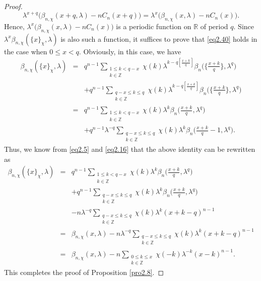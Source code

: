 \documentclass[reqno]{amsart}
\numberwithin{equation}{section}
\begin{document}
\begin{proof}
\begin{equation*}
\lambda^{x+q}\bigl(\beta_{n,\chi}(x+q,\lambda)-nC_{n}(x+q)\bigl)=\lambda^{x}\bigl(\beta_{n,\chi}(x,\lambda)-nC_{n}(x)\bigl).
\end{equation*}
Hence, $\lambda^{x}\bigl(\beta_{n,\chi}(x,\lambda)-nC_{n}(x)\bigl)$ is a periodic function on $\mathbb{R}$ of period $q$.
Since $\lambda^{x}\beta_{n,\chi}(\{x\}_{\chi},\lambda)$ is also such a function, it suffices to prove that \eqref{eq2.40} holds in the case when $0\leqslant x<q$. Obviously, in this case, we have
\begin{eqnarray*}
\beta_{n,\chi}(\{x\}_{\chi},\lambda)&=&q^{n-1}\underset{\substack{1\leqslant k< q-x\\ k\in\mathbb{Z}}}{\sum}\chi(k)\lambda^{k-q[\frac{x+k}{q}]}\beta_{n}\biggl(\biggl\{\frac{x+k}{q}\biggl\},\lambda^{q}\biggl)\nonumber\\
&&+q^{n-1}\underset{\substack{q-x\leqslant k\leqslant q\\ k\in\mathbb{Z}}}{\sum}\chi(k)\lambda^{k-q[\frac{x+k}{q}]}\beta_{n}\biggl(\biggl\{\frac{x+k}{q}\biggl\},\lambda^{q}\biggl)\nonumber\\
&=&q^{n-1}\underset{\substack{1\leqslant k< q-x\\ k\in\mathbb{Z}}}{\sum}\chi(k)\lambda^{k}\beta_{n}\biggl(\frac{x+k}{q},\lambda^{q}\biggl)\nonumber\\
&&+q^{n-1}\lambda^{-q}\underset{\substack{q-x\leqslant k\leqslant q\\ k\in\mathbb{Z}}}{\sum}\chi(k)\lambda^{k}\beta_{n}\biggl(\frac{x+k}{q}-1,\lambda^{q}\biggl).
\end{eqnarray*}
Thus, we know from \eqref{eq2.5} and \eqref{eq2.16} that the above identity can be rewritten as
\begin{eqnarray*}
\beta_{n,\chi}(\{x\}_{\chi},\lambda)&=&q^{n-1}\underset{\substack{1\leqslant k< q-x\\ k\in\mathbb{Z}}}{\sum}\chi(k)\lambda^{k}\beta_{n}\biggl(\frac{x+k}{q},\lambda^{q}\biggl)\nonumber\\
&&+q^{n-1}\underset{\substack{q-x\leqslant k\leqslant q\\ k\in\mathbb{Z}}}{\sum}\chi(k)\lambda^{k}\beta_{n}\biggl(\frac{x+k}{q},\lambda^{q}\biggl)\nonumber\\
&&-n\lambda^{-q}\underset{\substack{q-x\leqslant k\leqslant q\\ k\in\mathbb{Z}}}{\sum}\chi(k)\lambda^{k}(x+k-q)^{n-1}\nonumber\\
&=&\beta_{n,\chi}(x,\lambda)-n\lambda^{-q}\underset{\substack{q-x\leqslant k\leqslant q\\ k\in\mathbb{Z}}}{\sum}\chi(k)\lambda^{k}(x+k-q)^{n-1}\nonumber\\
&=&\beta_{n,\chi}(x,\lambda)-n\underset{\substack{0\leqslant k\leqslant x\\ k\in\mathbb{Z}}}{\sum}\chi(-k)\lambda^{-k}(x-k)^{n-1}.
\end{eqnarray*}
This completes the proof of Proposition \ref{pro2.8}.
\end{proof}
\end{document}
